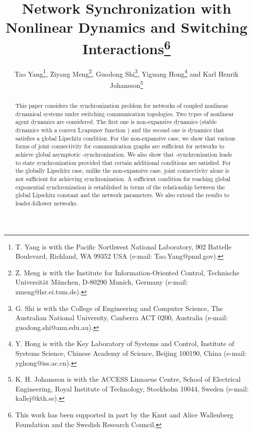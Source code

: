 \documentclass[a4paper, 11pt]{article}
\begin{document}
\title{Network Synchronization  with Nonlinear Dynamics  and Switching Interactions\thanks{This work has been supported in part by the Knut and Alice Wallenberg Foundation and the Swedish Research
Council.}}
\date{}

\author{Tao Yang\thanks{T. Yang is with the Pacific Northwest National Laboratory, 902 Battelle Boulevard, Richland, WA 99352 USA (e-mail: Tao.Yang@pnnl.gov).}, Ziyang Meng\thanks{Z. Meng is with the Institute for Information-Oriented Control, Technische Universit\"{a}t M\"{u}nchen, D-80290 Munich, Germany (e-mail: zmeng@lsr.ei.tum.de).}, Guodong Shi\thanks{G. Shi is with the College of Engineering and Computer Science, The Australian National University, Canberra ACT 0200, Australia (e-mail: guodong.shi@anu.edu.au).}, Yiguang Hong\thanks{Y. Hong is with the Key Laboratory of Systems and Control, Institute of Systems Science, Chinese Academy of Science, Beijing 100190, China (e-mail: yghong@iss.ac.cn).} and Karl Henrik Johansson\thanks{K. H. Johansson is with the ACCESS Linnaeus Centre, School of Electrical Engineering, Royal Institute of Technology, Stockholm 10044, Sweden (e-mail: kallej@kth.se).}
}


\maketitle

\begin{abstract}
This paper considers the synchronization problem for networks of coupled nonlinear dynamical systems under switching communication topologies. Two types of nonlinear agent dynamics are considered.
The first one is non-expansive dynamics (stable dynamics with a convex Lyapunov function ) and the second one is dynamics that satisfies a global Lipschitz condition.
For the non-expansive case, we show that various forms of joint connectivity for communication graphs are
sufficient for networks to achieve global asymptotic -synchronization.
We also show that -synchronization leads to state synchronization provided that certain additional conditions are satisfied.
For the globally Lipschitz case, unlike the non-expansive case, joint connectivity alone is not sufficient for achieving synchronization. A sufficient condition for reaching global exponential synchronization is established in terms of the relationship between the global Lipschitz constant and the network parameters. We also extend the results to leader-follower networks. 
\end{abstract}
\end{document}
